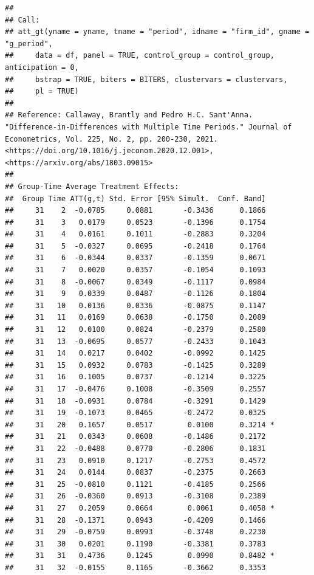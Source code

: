 \documentclass[
]{article}
\begin{document}
\begin{verbatim}
## 
## Call:
## att_gt(yname = yname, tname = "period", idname = "firm_id", gname = "g_period", 
##     data = df, panel = TRUE, control_group = control_group, anticipation = 0, 
##     bstrap = TRUE, biters = BITERS, clustervars = clustervars, 
##     pl = TRUE)
## 
## Reference: Callaway, Brantly and Pedro H.C. Sant'Anna.  "Difference-in-Differences with Multiple Time Periods." Journal of Econometrics, Vol. 225, No. 2, pp. 200-230, 2021. <https://doi.org/10.1016/j.jeconom.2020.12.001>, <https://arxiv.org/abs/1803.09015> 
## 
## Group-Time Average Treatment Effects:
##  Group Time ATT(g,t) Std. Error [95% Simult.  Conf. Band]  
##     31    2  -0.0785     0.0881       -0.3436      0.1866  
##     31    3   0.0179     0.0523       -0.1396      0.1754  
##     31    4   0.0161     0.1011       -0.2883      0.3204  
##     31    5  -0.0327     0.0695       -0.2418      0.1764  
##     31    6  -0.0344     0.0337       -0.1359      0.0671  
##     31    7   0.0020     0.0357       -0.1054      0.1093  
##     31    8  -0.0067     0.0349       -0.1117      0.0984  
##     31    9   0.0339     0.0487       -0.1126      0.1804  
##     31   10   0.0136     0.0336       -0.0875      0.1147  
##     31   11   0.0169     0.0638       -0.1750      0.2089  
##     31   12   0.0100     0.0824       -0.2379      0.2580  
##     31   13  -0.0695     0.0577       -0.2433      0.1043  
##     31   14   0.0217     0.0402       -0.0992      0.1425  
##     31   15   0.0932     0.0783       -0.1425      0.3289  
##     31   16   0.1005     0.0737       -0.1214      0.3225  
##     31   17  -0.0476     0.1008       -0.3509      0.2557  
##     31   18  -0.0931     0.0784       -0.3291      0.1429  
##     31   19  -0.1073     0.0465       -0.2472      0.0325  
##     31   20   0.1657     0.0517        0.0100      0.3214 *
##     31   21   0.0343     0.0608       -0.1486      0.2172  
##     31   22  -0.0488     0.0770       -0.2806      0.1831  
##     31   23   0.0910     0.1217       -0.2753      0.4572  
##     31   24   0.0144     0.0837       -0.2375      0.2663  
##     31   25  -0.0810     0.1121       -0.4185      0.2566  
##     31   26  -0.0360     0.0913       -0.3108      0.2389  
##     31   27   0.2059     0.0664        0.0061      0.4058 *
##     31   28  -0.1371     0.0943       -0.4209      0.1466  
##     31   29  -0.0759     0.0993       -0.3748      0.2230  
##     31   30   0.0201     0.1190       -0.3381      0.3783  
##     31   31   0.4736     0.1245        0.0990      0.8482 *
##     31   32  -0.0155     0.1165       -0.3662      0.3353  

\end{verbatim}
\end{document}
